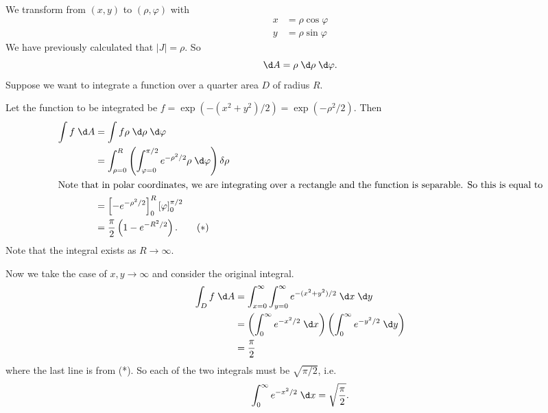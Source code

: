 \documentclass[a4paper]{article}
\begin{document}
\begin{eg}
  We transform from $(x, y)$ to $(\rho, \varphi)$ with
  \begin{align*}
    x &= \rho\cos \varphi\\
    y &= \rho\sin \varphi
  \end{align*}
  We have previously calculated that $|J| = \rho$. So
  \[
    \d A = \rho \;\d \rho \;\d \varphi.
  \]
  Suppose we want to integrate a function over a quarter area $D$ of radius $R$.
  \begin{center}
  \end{center}
  Let the function to be integrated be $f = \exp(-(x^2 + y^2)/2) = \exp(-\rho^2/2)$. Then
  \begin{align*}
    \int f\;\d A &= \int f\rho\;\d\rho\;\d\varphi\\
    &=\int_{\rho=0}^R\left(\int_{\varphi=0}^{\pi/2}e^{-\rho^2/2}\rho \;\d \varphi\right)\delta \rho\\
    \intertext{Note that in polar coordinates, we are integrating over a rectangle and the function is separable. So this is equal to}
    &= \left[-e^{-\rho^2/2}\right]^R_0\left[\varphi\right]_0^{\pi/2}\\
    &= \frac{\pi}{2}\left( 1 - e^{-R^2/2}\right).\tag{$*$}
  \end{align*}
  Note that the integral exists as $R\to \infty$.

  Now we take the case of $x, y\to \infty$ and consider the original integral.
  \begin{align*}
    \int _D f\;\d A &= \int_{x = 0}^{\infty} \int_{y=0}^\infty e^{-(x^2 + y^2)/2}\;\d x\;\d y\\
    &= \left(\int_0^\infty e^{-x^2/2}\;\d x\right)\left(\int_0^\infty e^{-y^2/2}\;\d y\right)\\
    &= \frac{\pi}{2}
  \end{align*}
  where the last line is from (*). So each of the two integrals must be $\sqrt{\pi/2}$, i.e.
  \[
    \int_0^\infty e^{-x^2/2}\;\d x = \sqrt{\frac{\pi}{2}}.
  \]

\end{eg}
\end{document}
